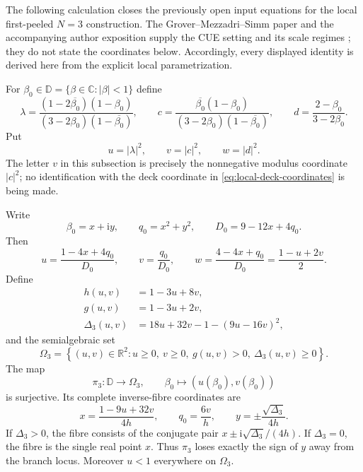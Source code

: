 The following calculation closes the previously open input equations for the local
first-peeled $N=3$ construction.  The Grover--Mezzadri--Simm paper and the accompanying
author exposition supply the CUE setting and its scale regimes
\cite{groverMezzadriSimm2026,easyRiders2026CUE}; they do not state the coordinates below.
Accordingly, every displayed identity is derived here from the explicit local
parametrization.

For $\beta_0\in\mathbb D=\{\beta\in\mathbb C:|\beta|<1\}$ define
\begin{equation}
 \lambda=
 \frac{(1-2\overline{\beta_0})(1-\beta_0)}
 {(3-2\beta_0)(1-\overline{\beta_0})},
 \qquad
 c=
 \frac{\overline{\beta_0}(1-\beta_0)}
 {(3-2\beta_0)(1-\overline{\beta_0})},
 \qquad
 d=\frac{2-\beta_0}{3-2\beta_0}.
 \label{eq:n3-peeled-lambda-c-d}
\end{equation}
Put
\begin{equation}
 u=|\lambda|^2,\qquad v=|c|^2,\qquad w=|d|^2.
 \label{eq:n3-peeled-u-v-w}
\end{equation}
The letter $v$ in this subsection is precisely the nonnegative modulus coordinate
$|c|^2$; no identification with the deck coordinate in
\eqref{eq:local-deck-coordinates} is being made.

\begin{theorem}
\label{thm:n3-base-quotient}
Write
\[
 \beta_0=x+\mathrm i y,\qquad q_0=x^2+y^2,
 \qquad D_0=9-12x+4q_0.
\]
Then
\begin{equation}
 u=\frac{1-4x+4q_0}{D_0},\qquad
 v=\frac{q_0}{D_0},\qquad
 w=\frac{4-4x+q_0}{D_0}=\frac{1-u+2v}{2}.
 \label{eq:n3-forward-base-coordinates}
\end{equation}
Define
\begin{align}
 h(u,v)&=1-3u+8v,\\
 g(u,v)&=1-3u+2v,\\
 \Delta_3(u,v)&=
 18u+32v-1-(9u-16v)^2,
 \label{eq:n3-base-discriminant}
\end{align}
and the semialgebraic set
\begin{equation}
 \Omega_3=
 \left\{(u,v)\in\mathbb R^2:
 u\ge0,\ v\ge0,\ g(u,v)>0,\ \Delta_3(u,v)\ge0\right\}.
 \label{eq:n3-base-domain}
\end{equation}
The map
\[
 \pi_3:\mathbb D\longrightarrow\Omega_3,\qquad
 \beta_0\longmapsto(u(\beta_0),v(\beta_0))
\]
is surjective.  Its complete inverse-fibre coordinates are
\begin{equation}
 x=\frac{1-9u+32v}{4h},\qquad
 q_0=\frac{6v}{h},\qquad
 y=\pm\frac{\sqrt{\Delta_3}}{4h}.
 \label{eq:n3-base-inverse}
\end{equation}
If $\Delta_3>0$, the fibre consists of the conjugate pair
$x\pm\mathrm i\sqrt{\Delta_3}/(4h)$.  If $\Delta_3=0$, the fibre is the
single real point $x$.  Thus $\pi_3$ loses exactly the sign of $y$ away from the
branch locus.  Moreover $u<1$ everywhere on $\Omega_3$.
\end{theorem}

